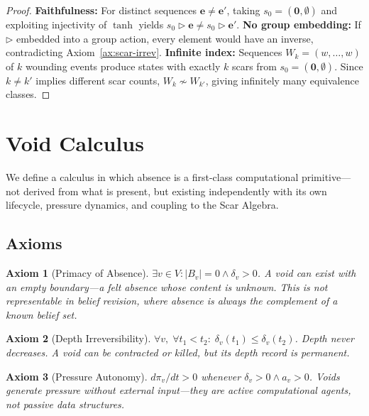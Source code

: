 \documentclass[11pt]{article}
\newtheorem{axiom}{Axiom}[section]
\begin{document}
\begin{proof}
\textbf{Faithfulness:} For distinct sequences $\mathbf{e} \neq \mathbf{e}'$, taking $s_0 = (\mathbf{0}, \emptyset)$ and exploiting injectivity of $\tanh$ yields $s_0 \triangleright \mathbf{e} \neq s_0 \triangleright \mathbf{e}'$. \textbf{No group embedding:} If $\triangleright$ embedded into a group action, every element would have an inverse, contradicting Axiom~\ref{ax:scar-irrev}. \textbf{Infinite index:} Sequences $W_k = (w, \ldots, w)$ of $k$ wounding events produce states with exactly $k$ scars from $s_0 = (\mathbf{0}, \emptyset)$. Since $k \neq k'$ implies different scar counts, $W_k \not\sim W_{k'}$, giving infinitely many equivalence classes.
\end{proof}

\section{Void Calculus}
\label{sec:void}

We define a calculus in which absence is a first-class computational primitive---not derived from what is present, but existing independently with its own lifecycle, pressure dynamics, and coupling to the Scar Algebra.

\subsection{Axioms}

\begin{axiom}[Primacy of Absence]
\label{ax:void-primacy}
$\exists v \in V: |B_v| = 0 \wedge \delta_v > 0$. A void can exist with an empty boundary---a felt absence whose content is unknown. This is not representable in belief revision, where absence is always the complement of a known belief set.
\end{axiom}

\begin{axiom}[Depth Irreversibility]
\label{ax:void-depth}
$\forall v,\; \forall t_1 < t_2:\; \delta_v(t_1) \leq \delta_v(t_2)$. Depth never decreases. A void can be contracted or killed, but its depth record is permanent.
\end{axiom}

\begin{axiom}[Pressure Autonomy]
\label{ax:void-pressure}
$d\pi_v/dt > 0$ whenever $\delta_v > 0 \wedge a_v > 0$. Voids generate pressure without external input---they are active computational agents, not passive data structures.
\end{axiom}
\end{document}
